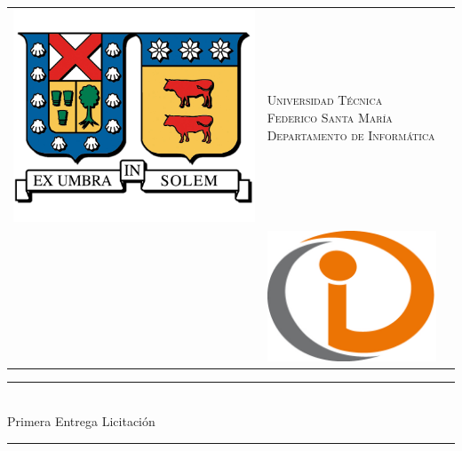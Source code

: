 \documentclass[paper=letter, fontsize=11pt]{scrartcl} %
\author{Ignacio Ampuero S. 201473032-2\\ Anghelo Carvajal C. 201473062-4\\Eduardo Pozo V. 201473040-3}
\date{\normalsize\today} %
\numberwithin{equation}{section} %
\numberwithin{figure}{section} %
\numberwithin{table}{section} %
\newcommand{\horrule}[1]{\rule{\linewidth}{#1}} %
\begin{document}
\begin{center}
  \setlength{\tabcolsep}{0pt}
  \begin{tabular}{>{\raggedleft}m{2.5cm}>{\centering}m{\dimexpr\textwidth - 5cm\relax}>{\raggedright}m{2.5cm}}
  \includegraphics[width=\linewidth]{logo}%
  &%
 \textsc{Universidad Técnica Federico Santa María\\Departamento de Informática} \\ [25pt] %
  &%
  \includegraphics[width=\linewidth]{di} %
  \end{tabular}
 
\normalfont \normalsize 
\horrule{0.5pt} \\[0.4cm] %
\huge Primera Entrega Licitación \\ %
\horrule{2pt} \\[0.5cm] %
\end{center}
\end{document}
